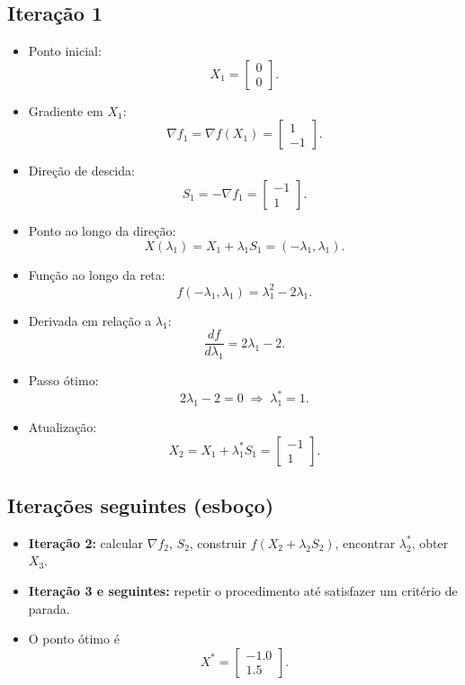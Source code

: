 \documentclass[9pt,a4paper]{extarticle}
\begin{document}
\subsection{Iteração 1}

\begin{itemize}
    \item Ponto inicial:
    \[
      X_1 =
      \begin{bmatrix}
        0 \\ 0
      \end{bmatrix}.
    \]
    \item Gradiente em $X_1$:
    \[
      \nabla f_1 = \nabla f(X_1) =
      \begin{bmatrix}
        1 \\ -1
      \end{bmatrix}.
    \]
    \item Direção de descida:
    \[
      S_1 = -\nabla f_1 =
      \begin{bmatrix}
        -1 \\ 1
      \end{bmatrix}.
    \]
    \item Ponto ao longo da direção:
    \[
      X(\lambda_1) = X_1 + \lambda_1 S_1 = (-\lambda_1, \lambda_1).
    \]
    \item Função ao longo da reta:
    \[
      f(-\lambda_1, \lambda_1) = \lambda_1^2 - 2\lambda_1.
    \]
    \item Derivada em relação a $\lambda_1$:
    \[
      \frac{df}{d\lambda_1} = 2\lambda_1 - 2.
    \]
    \item Passo ótimo:
    \[
      2\lambda_1 - 2 = 0 \;\Rightarrow\; \lambda_1^\ast = 1.
    \]
    \item Atualização:
    \[
      X_2 = X_1 + \lambda_1^\ast S_1 =
      \begin{bmatrix}
        -1 \\ 1
      \end{bmatrix}.
    \]
\end{itemize}

\subsection{Iterações seguintes (esboço)}

\begin{itemize}
    \item \textbf{Iteração 2:} calcular $\nabla f_2$, $S_2$, construir $f(X_2 + \lambda_2 S_2)$, encontrar $\lambda_2^\ast$, obter $X_3$.
    \item \textbf{Iteração 3 e seguintes:} repetir o procedimento até satisfazer um critério de parada.
    \item O ponto ótimo é
    \[
      X^\ast =
      \begin{bmatrix}
        -1.0 \\ 1.5
      \end{bmatrix}.
    \]
\end{itemize}
\end{document}
